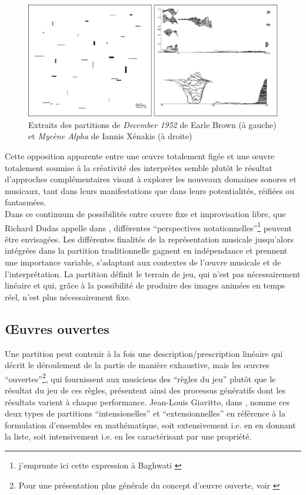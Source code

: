 \begin{figure}[!htbp]
	\includegraphics[width=\textwidth]{gfx/notation/Brown-Xenakis-Paysage.png}
	\caption{Extraits des partitions de \textit{December 1952} de Earle Brown (à gauche) et \textit{Mycène Alpha} de Iannis Xénakis (à droite)}
	\label{fig:notation:brown-xenakis}
\end{figure}

Cette opposition apparente entre une œuvre totalement figée et une œuvre totalement soumise à la créativité des interprètes semble plutôt le résultat d'approches complémentaires visant à explorer les nouveaux domaines sonores et musicaux, tant dans leurs manifestations que dans leurs potentialités, réifiées ou fantasmées.\\
\indent Dans ce continuum de possibilités entre œuvre fixe et improvisation libre, que Richard Dudas appelle  dans \cite{dudas_comprovisation:_2010}, différentes ``perspectives notationnelles''\footnote{j'emprunte ici cette expression à Baghwati \cite{bhagwati_notational_2013}} peuvent être envisagées. Les différentes finalités de la représentation musicale jusqu'alors intégrées dans la partition traditionnelle gagnent en indépendance et prennent une importance variable, s'adaptant aux contextes de l'œuvre musicale et de l'interprétation. La partition définit le terrain de jeu, qui n'est pas nécessairement linéaire et qui, grâce à la possibilité de produire des images animées en temps réel, n'est plus nécessairement fixe.

\subsection{Œuvres ouvertes}

\noindent Une partition peut contenir à la fois une description/prescription linéaire qui décrit le déroulement de la partie de manière exhaustive, mais les œuvres ``ouvertes''\footnote{Pour une présentation plus générale du concept d'œuvre ouverte, voir \cite{eco_oeuvre_2015}}, qui fournissent aux musiciens des ``règles du jeu'' plutôt que le résultat du jeu de ces règles, présentent ainsi des processus génératifs dont les résultats varient à chaque performance. Jean-Louis Giavitto, dans \cite{giavitto_du_2014}, nomme ces deux types de partitions ``intensionelles'' et ``extensionnelles'' en référence à la formulation d'ensembles en mathématique, soit extensivement i.e. en en donnant la liste, soit intensivement i.e. en les caractérisant par une propriété. 

